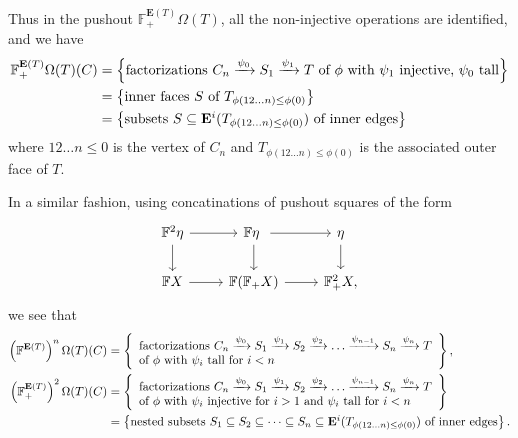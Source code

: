 \documentclass[a4paper,10pt
,draft
]{article}%
\renewcommand{\1}{\eta}%
\begin{document}
Thus in the pushout $\mathbb F^{\mathbf E(T)}_+\Omega(T)$, all the non-injective operations are identified, and we have
\begin{align*}
  \mathbb F^{\mathbf E(T)}_+\Omega(T)(C)
  & = \left\{\mbox{factorizations $C_n \xrightarrow{\psi_0} S_1 \xrightarrow{\psi_1} T$ of $\phi$ with $\psi_1$ injective, $\psi_0$ tall}\right\} \\
  & = \left\{\mbox{inner faces $S$ of $T_{\phi(1 2 \dots n) \leq \phi(0)}$}\right\} \\
  & = \left\{\mbox{subsets $S \subseteq \mathbf E^i(T_{\phi(1 2 \dots n) \leq \phi(0)})$ of inner edges}\right\}    
\end{align*}
where $1 2 \dots n \leq 0$ is the vertex of $C_n$ and $T_{\phi(1 2 \dots n) \leq \phi(0)}$ is the associated outer face of $T$.

In a similar fashion,
{\color{OliveGreen} using concatinations of pushout squares of the form
  \[
        \begin{tikzcd}
              \mathbb F^2 \eta \arrow[r] \arrow[d]
              &
              \mathbb F \eta \arrow[d] \arrow[r]\
              &
              \eta \arrow[d]
              \\
              \mathbb F X \arrow[r]
              &
              \mathbb F( \mathbb F_+ X) \arrow[r]
              &
              \mathbb F_+^2 X,
        \end{tikzcd}
  \]
} %
  we see that
\begin{align*}
  \left(\mathbb F^{\mathbf E(T)}\right)^n \Omega(T)(C)
  & = \left\{
    \begin{array}{l}
      \mbox{factorizations $C_n \xrightarrow{\psi_0} S_1 \xrightarrow{\psi_1} S_2 \xrightarrow{\psi_2} \dots \xrightarrow{\psi_{n-1}} S_n \xrightarrow{\psi_n} T$}
      \\
      \mbox{of $\phi$ with $\psi_i$ tall for $i < n$}
    \end{array}
  \right\},
  \\
  \left(\mathbb F^{\mathbf E(T)}_+ \right)^2 \Omega(T)(C)
  & = \left\{
    \begin{array}{l}
      \mbox{factorizations $C_n \xrightarrow{\psi_0} S_1 \xrightarrow{\psi_1} S_2 \xrightarrow{\psi_2} \dots \xrightarrow{\psi_{n-1}} S_n \xrightarrow{\psi_n} T$}
      \\
      \mbox{of $\phi$ with $\psi_i$ injective for $i > 1$ and $\psi_i$ tall for $i < n$}
    \end{array}
  \right\}
  \\
  &= \left\{\mbox{nested subsets $S_1 \subseteq S_2 \subseteq \dots \subseteq S_n \subseteq \mathbf E^i(T_{\phi(1 2 \dots n) \leq \phi(0)})$ of inner edges}\right\}.
\end{align*}
\end{document}
